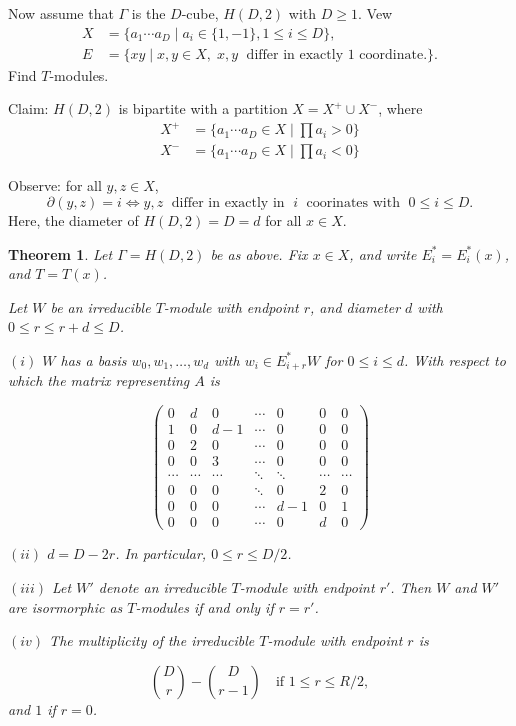 \documentclass[
]{book}
\newtheorem{theorem}{Theorem}[chapter]
\theoremstyle{definition}
\theoremstyle{definition}
\theoremstyle{definition}
\theoremstyle{definition}
\theoremstyle{remark}
\begin{document}
Now assume that \(\Gamma\) is the \(D\)-cube, \(H(D,2)\) with \(D\geq 1\). Vew
\begin{align}
X & = \{a_1\cdots a_D\mid a_i\in \{1, -1\}, 1\leq i\leq D\},\\
E & = \{xy\mid x, y\in X, \; x, y \;\text{ differ in exactly 1 coordinate.}\}.
\end{align}
Find \(T\)-modules.

Claim: \(H(D,2)\) is bipartite with a partition \(X = X^+ \cup X^-\), where
\begin{align}
X^+ & = \{a_1\cdots a_D\in X\mid \prod a_i > 0\}\\
X^- & = \{a_1\cdots a_D \in X \mid \prod a_i < 0\}
\end{align}

Observe: for all \(y, z\in X\),
\[\partial(y,z) = i \Leftrightarrow y, z \; \text{ differ in exactly in }\; i\; \text{ coorinates with }\; 0\leq i\leq D.\]
Here, the diameter of \(H(D, 2) = D = d\) for all \(x\in X\).

\begin{theorem}
\protect\hypertarget{thm:hd2-modules}{}\label{thm:hd2-modules}Let \(\Gamma = H(D,2)\) be as above. Fix \(x\in X\), and write \(E_i^* = E^*_i(x)\), and \(T = T(x)\).

Let \(W\) be an irreducible \(T\)-module with endpoint \(r\), and diameter \(d\) with \(0\leq r \leq r+d\leq D\).

\((i)\) \(W\) has a basis \(w_0, w_1, \ldots, w_d\) with \(w_i\in E^*_{i+r}W\) for \(0\leq i\leq d\). With respect to which the matrix representing \(A\) is

\[
\begin{pmatrix}
0 & d & 0 & \cdots & 0 & 0 & 0\\
1 & 0 & d-1 & \cdots & 0 & 0 & 0\\
0 & 2 & 0 & \cdots & 0 & 0 & 0\\
0 & 0 & 3 & \cdots & 0 & 0 & 0\\
\cdots & \cdots & \cdots & \ddots & \ddots & \cdots & \cdots \\
0 & 0 & 0 & \ddots & 0 & 2 & 0\\
0 & 0 & 0 & \cdots & d-1 & 0 & 1\\
0 & 0 & 0 & \cdots & 0 & d & 0
\end{pmatrix}
\]

\((ii)\) \(d= D-2r\). In particular, \(0\leq r\leq D/2\).

\((iii)\) Let \(W'\) denote an irreducible \(T\)-module with endpoint \(r'\). Then \(W\) and \(W'\) are isormorphic as \(T\)-modules if and only if \(r = r'\).

\((iv)\) The multiplicity of the irreducible \(T\)-module with endpoint \(r\) is

\[\binom{D}{r} - \binom{D}{r-1} \quad \text{if } 1\leq r \leq R/2,\]
and \(1\) if \(r = 0\).
\end{theorem}
\end{document}
